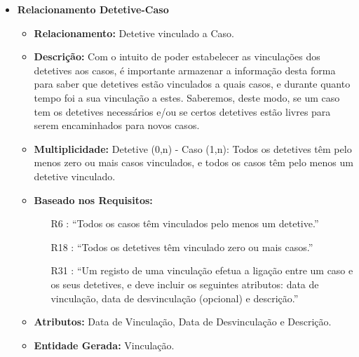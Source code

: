\documentclass[a4paper,12pt]{scrreprt}
\begin{document}
        \begin{itemize}
        \item\textbf{Relacionamento Detetive-Caso}
        \begin{itemize}
            \item\textbf{Relacionamento:} Detetive vinculado a Caso.
            \item\textbf{Descrição:} Com o intuito de poder estabelecer as vinculações dos detetives aos casos, é importante armazenar a informação desta forma para saber que detetives estão vinculados a quais casos, e durante quanto tempo foi a sua vinculação a estes. Saberemos, deste modo, se um caso tem os detetives necessários e/ou se certos detetives estão livres para serem encaminhados para novos casos.
            \item\textbf{Multiplicidade:} Detetive (0,n) - Caso (1,n): Todos os detetives têm pelo menos zero ou mais casos vinculados, e todos os casos têm pelo menos um detetive vinculado.
            \item\textbf{Baseado nos Requisitos:}
            \begin{itemize}
                \item [R6]: “Todos os casos têm vinculados pelo menos um detetive.”
                \item [R18]: “Todos os detetives têm vinculado zero ou mais casos.”
                \item [R31]: “Um registo de uma vinculação efetua a ligação entre um caso e os seus detetives, e deve incluir os seguintes atributos: data de vinculação, data de desvinculação (opcional) e descrição.”
            \end{itemize}
            \item\textbf{Atributos:} Data de Vinculação, Data de Desvinculação e Descrição.
            \item\textbf{Entidade Gerada:} Vinculação.
        \end{itemize}
        
        \clearpage


\end{itemize}
\end{document}
